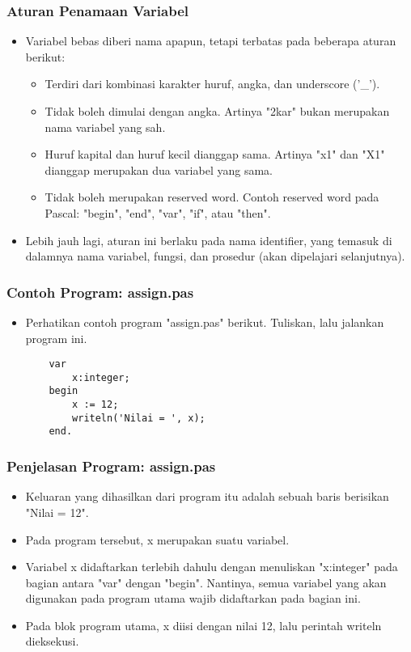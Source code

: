 \documentclass{beamer}
\begin{document}
\begin{frame}
\frametitle{Aturan Penamaan Variabel}
\begin{itemize}
	\item Variabel bebas diberi nama apapun, tetapi terbatas pada beberapa aturan berikut:
	\begin{itemize}
		\item Terdiri dari kombinasi karakter huruf, angka, dan underscore ('\_').
		\item Tidak boleh dimulai dengan angka. Artinya "2kar" bukan merupakan nama variabel yang sah.
		\item Huruf kapital dan huruf kecil dianggap sama. Artinya "x1" dan "X1" dianggap merupakan dua variabel yang sama.
		\item Tidak boleh merupakan \alert{reserved word}. Contoh reserved word pada Pascal: "begin", "end", "var", "if", atau "then".
	\end{itemize}
	\item Lebih jauh lagi, aturan ini berlaku pada nama \alert{identifier}, yang temasuk di dalamnya nama variabel, fungsi, dan prosedur (akan dipelajari selanjutnya).
\end{itemize}
\end{frame}

\begin{frame}[fragile]
\frametitle{Contoh Program: assign.pas}
\begin{itemize}
	\item Perhatikan contoh program "assign.pas" berikut. Tuliskan, lalu jalankan program ini.
	\begin{lstlisting}
	var
	    x:integer;
	begin
	    x := 12;
	    writeln('Nilai = ', x);
	end.
	\end{lstlisting}
\end{itemize}
\end{frame}

\begin{frame}[fragile]
\frametitle{Penjelasan Program: assign.pas}
\begin{itemize}
	\item Keluaran yang dihasilkan dari program itu adalah sebuah baris berisikan "Nilai = 12".
	\item Pada program tersebut, x merupakan suatu variabel.
	\item Variabel x didaftarkan terlebih dahulu dengan menuliskan "x:integer" pada bagian antara "var" dengan "begin". Nantinya, semua variabel yang akan digunakan pada program utama wajib didaftarkan pada bagian ini.
	\item Pada blok program utama, x diisi dengan nilai 12, lalu perintah writeln dieksekusi.
\end{itemize}
\end{frame}
\end{document}
